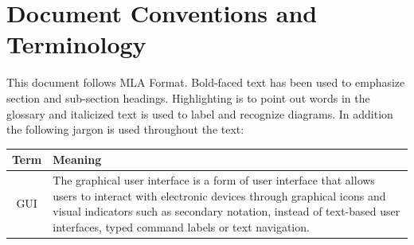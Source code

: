 \documentclass{scrreprt}
\begin{document}

\section{Document Conventions and Terminology}
This document follows MLA Format. Bold-faced text has been used to emphasize section
and sub-section headings. Highlighting is to point out words in the glossary and italicized text is
used to label and recognize diagrams. In addition the following jargon is used throughout the text:

\begin{center}
    \begin{tabular}{|c|p{10cm}|}
        \hline
	    Term & Meaning\\
        \hline
	     GUI&The graphical user interface is a form of user interface that allows users to interact with electronic devices through graphical icons and visual indicators such as secondary notation, instead of text-based user interfaces, typed command labels or text navigation. \\
        \hline
    \end{tabular}
\end{center}

\end{document}
